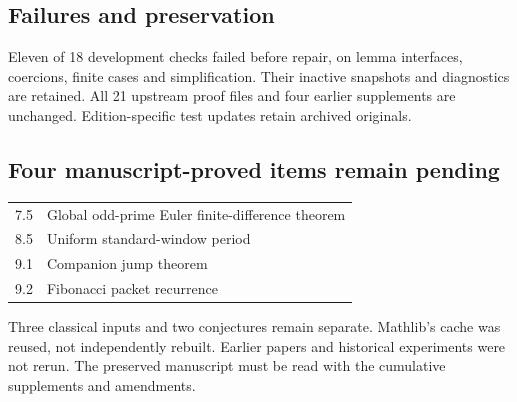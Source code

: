 \subsection*{Failures and preservation}
Eleven of 18 development checks failed before repair, on lemma interfaces, coercions, finite cases and simplification. Their inactive snapshots and diagnostics are retained. All 21 upstream proof files and four earlier supplements are unchanged. Edition-specific test updates retain archived originals.

\subsection*{Four manuscript-proved items remain pending}
\begin{center}
\begin{tabular}{@{}lp{}@{}}
7.5 & Global odd-prime Euler finite-difference theorem\\
8.5 & Uniform standard-window period\\
9.1 & Companion jump theorem\\
9.2 & Fibonacci packet recurrence\\
\end{tabular}
\end{center}
Three classical inputs and two conjectures remain separate. Mathlib's cache was reused, not independently rebuilt. Earlier papers and historical experiments were not rerun. The preserved manuscript must be read with the cumulative supplements and amendments.
